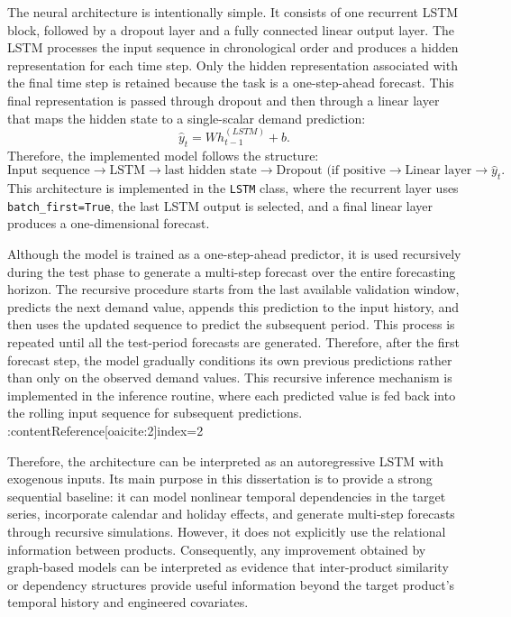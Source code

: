 The neural architecture is intentionally simple. It consists of one recurrent LSTM block, followed by a dropout layer and a fully connected linear output layer. The LSTM processes the input sequence in chronological order and produces a hidden representation for each time step. Only the hidden representation associated with the final time step is retained because the task is a one-step-ahead forecast. This final representation is passed through dropout and then through a linear layer that maps the hidden state to a single-scalar demand prediction:
\[
\hat{y}_t = W h_{t-1}^{(LSTM)} + b.
\]
Therefore, the implemented model follows the structure:
\[
\text{Input sequence} \rightarrow \text{LSTM} \rightarrow \text{last hidden state} \rightarrow \text{Dropout (if positive} \rightarrow \text{Linear layer} \rightarrow \hat{y}_t.
\]
This architecture is implemented in the \texttt{LSTM} class, where the recurrent layer uses \texttt{batch\_first=True}, the last LSTM output is selected, and a final linear layer produces a one-dimensional forecast.

Although the model is trained as a one-step-ahead predictor, it is used recursively during the test phase to generate a multi-step forecast over the entire forecasting horizon. The recursive procedure starts from the last available validation window, predicts the next demand value, appends this prediction to the input history, and then uses the updated sequence to predict the subsequent period. This process is repeated until all the test-period forecasts are generated. Therefore, after the first forecast step, the model gradually conditions its own previous predictions rather than only on the observed demand values. This recursive inference mechanism is implemented in the inference routine, where each predicted value is fed back into the rolling input sequence for subsequent predictions. :contentReference[oaicite:2]{index=2}

Therefore, the architecture can be interpreted as an autoregressive LSTM with exogenous inputs. Its main purpose in this dissertation is to provide a strong sequential baseline: it can model nonlinear temporal dependencies in the target series, incorporate calendar and holiday effects, and generate multi-step forecasts through recursive simulations. However, it does not explicitly use the relational information between products. Consequently, any improvement obtained by graph-based models can be interpreted as evidence that inter-product similarity or dependency structures provide useful information beyond the target product’s temporal history and engineered covariates.

